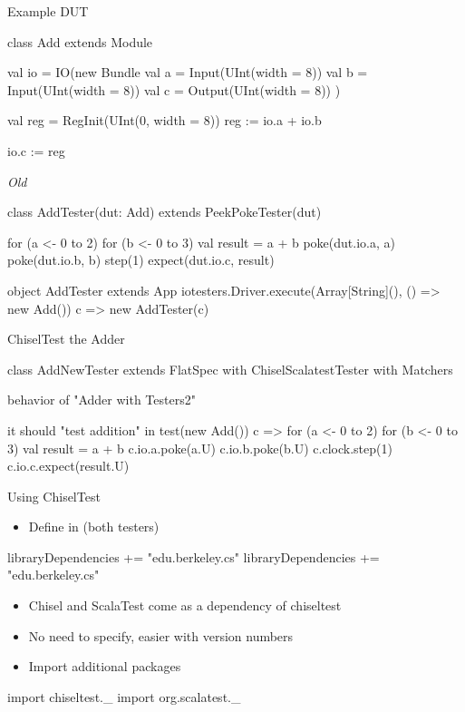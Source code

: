 \begin{frame}[fragile]{Example DUT}
\begin{chisel}
class Add extends Module {
  val io = IO(new Bundle {
    val a = Input(UInt(width = 8))
    val b = Input(UInt(width = 8))
    val c = Output(UInt(width = 8))
  })

  val reg = RegInit(UInt(0, width = 8))
  reg := io.a + io.b

  io.c := reg
}
\end{chisel}
\end{frame}

\begin{frame}[fragile]{\emph{Old} }
\begin{chisel}
class AddTester(dut: Add) extends PeekPokeTester(dut) {

  for (a <- 0 to 2) {
    for (b <- 0 to 3) {
      val result = a + b
      poke(dut.io.a, a)
      poke(dut.io.b, b)
      step(1)
      expect(dut.io.c, result)
    }
  }
}

object AddTester extends App {
  iotesters.Driver.execute(Array[String](), () => new Add()) { c => new AddTester(c) }
}
\end{chisel}
\end{frame}

\begin{frame}[fragile]{ChiselTest the Adder}
\begin{chisel}
class AddNewTester extends FlatSpec with ChiselScalatestTester with Matchers {

  behavior of "Adder with Testers2"

  it should "test addition" in {
    test(new Add()) { c =>
      for (a <- 0 to 2) {
        for (b <- 0 to 3) {
          val result = a + b
          c.io.a.poke(a.U)
          c.io.b.poke(b.U)
          c.clock.step(1)
          c.io.c.expect(result.U)
        }
      }
    }
  }
}
\end{chisel}
\end{frame}


\begin{frame}[fragile]{Using ChiselTest}
\begin{itemize}
\item Define in  (both testers)
\end{itemize}
\begin{chisel}
libraryDependencies += "edu.berkeley.cs" %
libraryDependencies += "edu.berkeley.cs" %
\end{chisel}
\begin{itemize}
\item Chisel and ScalaTest come as a dependency of chiseltest
\item No need to specify, easier with version numbers
\item Import additional packages
\end{itemize}
\begin{chisel}
import chiseltest._
import org.scalatest._
\end{chisel}
\end{frame}

